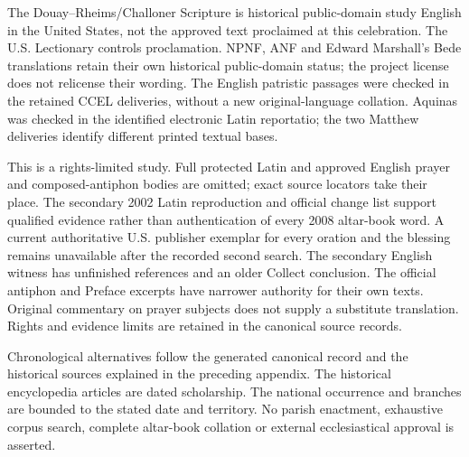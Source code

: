 The Douay--Rheims/Challoner Scripture is historical public-domain study English in the United States, not the approved text proclaimed at this celebration. The U.S. Lectionary controls proclamation. NPNF, ANF and Edward Marshall's Bede translations retain their own historical public-domain status; the project license does not relicense their wording. The English patristic passages were checked in the retained CCEL deliveries, without a new original-language collation. Aquinas was checked in the identified electronic Latin reportatio; the two Matthew deliveries identify different printed textual bases.

This is a rights-limited study. Full protected Latin and approved English prayer and composed-antiphon bodies are omitted; exact source locators take their place. The secondary 2002 Latin reproduction and official change list support qualified evidence rather than authentication of every 2008 altar-book word. A current authoritative U.S. publisher exemplar for every oration and the blessing remains unavailable after the recorded second search. The secondary English witness has unfinished references and an older Collect conclusion. The official antiphon and Preface excerpts have narrower authority for their own texts. Original commentary on prayer subjects does not supply a substitute translation. Rights and evidence limits are retained in the canonical source records.

Chronological alternatives follow the generated canonical record and the historical sources explained in the preceding appendix. The historical encyclopedia articles are dated scholarship. The national occurrence and branches are bounded to the stated date and territory. No parish enactment, exhaustive corpus search, complete altar-book collation or external ecclesiastical approval is asserted.


